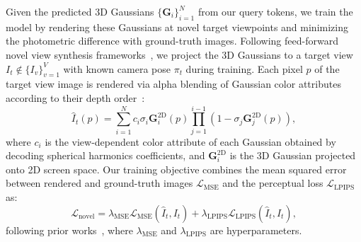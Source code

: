 Given the predicted 3D Gaussians $\{\mathbf{G}_i\}_{i=1}^N$ from our query tokens, we train the model by rendering these Gaussians at novel target viewpoints and minimizing the photometric difference with ground-truth images. Following feed-forward novel view synthesis frameworks~\cite{ye2024no}, we project the 3D Gaussians to a target view $I_t \notin \{I_v\}_{v=1}^V$ with known camera pose $\pi_t$ during training. Each pixel ${p}$ of the target view image is rendered via alpha blending of Gaussian color attributes according to their depth order~\cite{kerbl20233d}:
\begin{equation}
\hat{I}_t({p}) = \sum_{i=1}^N {c}_i\sigma_i\mathbf{G}^\text{2D}_i({p}) \prod_{j=1}^{i-1}(1-\sigma_j \mathbf{G}^\text{2D}_j({p})),
\end{equation}
where ${c}_i$ is the view-dependent color attribute of each Gaussian obtained by decoding spherical harmonics coefficients, and $\mathbf{G}^\text{2D}_i$ is the 3D Gaussian projected onto 2D screen space. Our training objective combines the mean squared error between rendered and ground-truth images $\mathcal{L}_{\text{MSE}}$ and the perceptual loss $\mathcal{L}_{\text{LPIPS}}$ as: 
\begin{equation}
\mathcal{L}_\text{novel} = \lambda_{\text{MSE}} \mathcal{L}_{\text{MSE}}(\hat{I}_t,I_t) + \lambda_{\text{LPIPS}} \mathcal{L}_{\text{LPIPS}}(\hat{I}_t,I_t),
\end{equation}
following prior works~\cite{ye2024no}, where $\lambda_{\text{MSE}}$ and $\lambda_{\text{LPIPS}}$ are hyperparameters.

